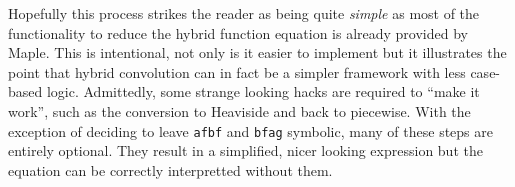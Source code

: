 Hopefully this process strikes the reader as being quite \emph{simple} as most of the functionality to reduce 
the hybrid function equation is already provided by Maple. 
This is intentional, not only is it easier to implement but it illustrates the point that hybrid convolution can in fact be  a
simpler framework with less case-based logic.
Admittedly, some strange looking hacks are required to ``make it work'', such as the conversion to Heaviside and back 
to piecewise.
With the exception of deciding to leave \texttt{afbf} and \texttt{bfag} symbolic, many of these steps are entirely optional.
They result in a simplified, nicer looking expression but the equation can be correctly interpretted without them.


\newpage